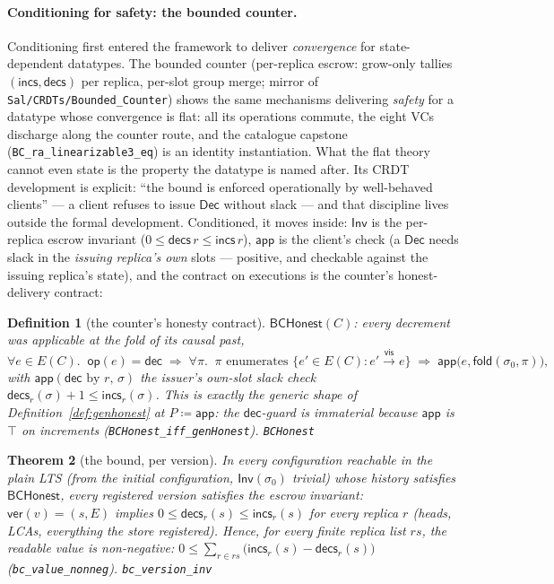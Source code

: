 \documentclass[11pt]{article}
\newtheorem{theorem}{Theorem}[section]
\newtheorem{definition}[theorem]{Definition}
\newcommand{\vis}{\xrightarrow{\mathsf{vis}}}
\newcommand{\Sinit}{\sigma_0}
\newcommand{\lean}[1]{\texttt{#1}}
\newcommand{\st}{\sigma}
\newcommand{\fold}{\mathsf{fold}}
\newcommand{\Inv}{\mathsf{Inv}}
\newcommand{\app}{\mathsf{app}}
\begin{document}
\paragraph{Conditioning for safety: the bounded counter.} Conditioning
first entered the framework to deliver \emph{convergence} for
state-dependent datatypes. The bounded counter (per-replica escrow:
grow-only tallies $(\mathsf{incs}, \mathsf{decs})$ per replica, per-slot
group merge; mirror of \lean{Sal/CRDTs/Bounded\_Counter}) shows the same
mechanisms delivering \emph{safety} for a datatype whose convergence is
flat: all its operations commute, the eight VCs discharge along the
counter route, and the catalogue capstone
(\lean{BC\_ra\_linearizable3\_eq}) is an identity instantiation. What the
flat theory cannot even state is the property the datatype is named
after. Its CRDT development is explicit: ``the bound is enforced
operationally by well-behaved clients'' --- a client refuses to issue
$\mathsf{Dec}$ without slack --- and that discipline lives outside the
formal development. Conditioned, it moves inside: $\Inv$ is the
per-replica escrow invariant
($0 \le \mathsf{decs}\,r \le \mathsf{incs}\,r$), $\app$ is
the client's check (a $\mathsf{Dec}$ needs slack in the \emph{issuing
replica's own} slots --- positive, and checkable against the issuing
replica's state), and the contract on executions is the counter's
honest-delivery contract:

\begin{definition}[the counter's honesty contract]
\label{def:bchonest}
$\mathsf{BCHonest}(C)$: every decrement was applicable at the fold of its causal
past,
\[
  \forall e \in E(C).\;\; \mathsf{op}(e) = \mathsf{dec} \;\Longrightarrow\;
  \forall \pi.\;\; \pi \text{ enumerates } \{e' \in E(C) : e' \vis e\}
  \;\Longrightarrow\; \app\bigl(e, \fold(\Sinit, \pi)\bigr),
\]
with $\app(\mathsf{dec} \text{ by } r,\, \st)$ the issuer's own-slot slack check
$\mathsf{decs}_r(\st) + 1 \le \mathsf{incs}_r(\st)$. This is exactly the generic shape
of Definition~\ref{def:genhonest} at $P \coloneqq \app$: the $\mathsf{dec}$-guard is
immaterial because $\app$ is $\top$ on increments
(\lean{BCHonest\_iff\_genHonest}).
\hfill\lean{BCHonest}
\end{definition}

\begin{theorem}[the bound, per version]
\label{thm:bcinv}
In every configuration reachable in the plain LTS (from the initial configuration,
$\Inv(\Sinit)$ trivial) whose history satisfies $\mathsf{BCHonest}$, every
registered version satisfies the escrow invariant: $\mathsf{ver}(v) = (s, E)$
implies $0 \le \mathsf{decs}_r(s) \le \mathsf{incs}_r(s)$ for every replica $r$
(heads, LCAs, everything the store registered). Hence, for every finite replica list
$rs$, the readable value is non-negative:
$0 \le \sum_{r \in rs}\bigl(\mathsf{incs}_r(s) - \mathsf{decs}_r(s)\bigr)$
(\lean{bc\_value\_nonneg}).
\hfill\lean{bc\_version\_inv}
\end{theorem}
\end{document}
